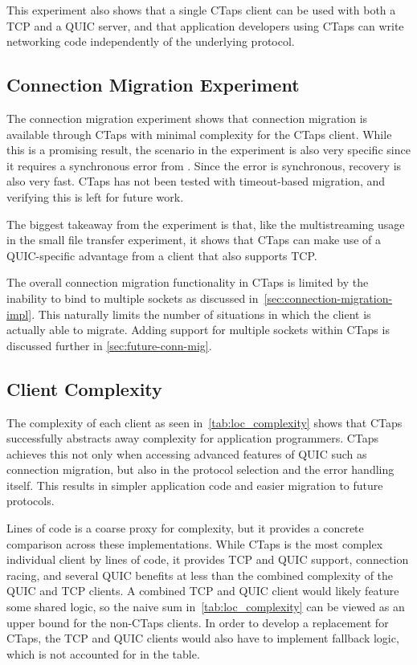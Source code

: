 This experiment also shows that a single CTaps client can be used with both a
TCP and a QUIC server, and that application developers using CTaps can write networking
code independently of the underlying protocol.

\subsection{Connection Migration Experiment}\label{sec:connection-mig-benchmark-discssion}
The connection migration experiment shows that connection migration is available through
CTaps with minimal complexity for the CTaps client. While this is a promising result,
the scenario in the experiment is also very specific since it requires a synchronous
error from . Since the error is synchronous, recovery is also very fast.
CTaps has not been tested with timeout-based migration, and verifying this is left for future work.

The biggest takeaway from the experiment is that, like the multistreaming
usage in the small file transfer experiment, it shows
that CTaps can make use of a QUIC-specific advantage
from a client that also supports TCP.

The overall connection migration functionality in CTaps is limited by the inability to bind
to multiple sockets as discussed in~\cref{sec:connection-migration-impl}.
This naturally limits the number of situations in which the client is actually able to migrate.
Adding support for multiple sockets
within CTaps is discussed further in \cref{sec:future-conn-mig}.

\subsection{Client Complexity}
The complexity of each client as seen in~\cref{tab:loc_complexity}
shows that CTaps successfully abstracts away complexity for application programmers.
CTaps achieves this not only when accessing advanced features of QUIC such as connection migration, but also in the protocol
selection and the error handling itself.
This results in simpler application code and easier migration to future protocols.

Lines of code is a coarse proxy for complexity, but it provides a
concrete comparison across these implementations.
While CTaps is the most complex
individual client by lines of code, it provides TCP and QUIC support, connection racing,
and several QUIC benefits at less than the combined complexity of the QUIC
and TCP clients. A combined TCP and QUIC client would likely feature
some shared logic, so the naive sum in~\cref{tab:loc_complexity} can
be viewed as an upper bound for the non-CTaps clients. 
In order to develop a replacement for CTaps, the TCP and QUIC
clients would also have to implement
fallback logic, which is not accounted for in the table.

